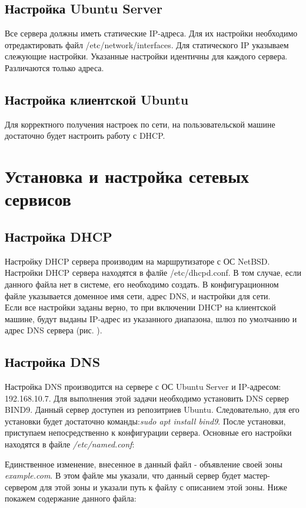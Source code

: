 \subsection{Настройка Ubuntu Server}
Все сервера должны иметь статические IP-адреса. Для их настройки необходимо отредактировать файл /etc/network/interfaces. Для статического IP указываем слежующие настройки. Указанные настройки идентичны для каждого сервера. Различаются только адреса. 


\subsection{Настройка клиентской Ubuntu}
Для корректного получения настроек по сети, на пользовательской машине достаточно будет настроить работу с DHCP.


\section{Установка и настройка сетевых сервисов}
\subsection{Настройка DHCP}
Настройку DHCP сервера производим на маршрутизаторе с ОС NetBSD. Настройки DHCP сервера находятся в фалйе /etc/dhcpd.conf. В том случае, если данного файла нет в системе, его необходимо создать. В конфигурационном файле указывается доменное имя сети, адрес DNS, и настройки для сети.\\
Если все настройки заданы верно, то при включении DHCP на клиентской машине, будут выданы IP-адрес из указанного диапазона, шлюз по умолчанию и адрес DNS сервера (рис. ).

\subsection{Настройка DNS}
Настройка DNS производится на сервере с ОС Ubuntu Server и IP-адресом: 192.168.10.7. Для выполнения этой задачи необходимо установить DNS сервер BIND9. Данный сервер доступен из репозитриев Ubuntu. Следовательно, для его установки будет достаточно команды:\textit{sudo apt install bind9}.
После установки, приступаем непосредственно к конфигурации сервера. Основные его настройки находятся в файле \textit{/etc/named.conf}:


Единственное изменение, внесенное в данный файл - объявление своей зоны \textit{example.com}. В этом файле мы указали, что данный сервер будет мастер-сервером для этой зоны и указали путь к файлу с описанием этой зоны. Ниже покажем содержание данного файла:


